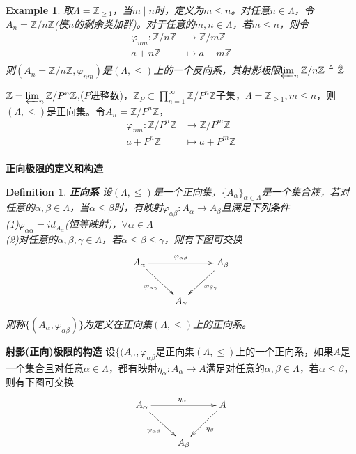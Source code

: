 \documentclass[UTF8]{article}
\newtheorem{defn}{Definition}[section]
\newtheorem{exa}{Example}[section]
\begin{document}
\begin{exa}
	取$\Lambda=\mathbb Z_{\geq1}$，当$m\mid n$时，定义为$m\leq n$。对任意$n\in\Lambda$，令$A_n=\mathbb Z/{n\mathbb Z}$(模$n$的剩余类加群)。对于任意的$m,n\in\Lambda$，若$m\leq n$，则令
	\[
	\begin{split}
	\varphi_{nm}:\mathbb Z/{n\mathbb Z}&\rightarrow\mathbb Z/{m\mathbb Z}\\
	a+n\mathbb Z&\longmapsto a+m\mathbb Z\\
	\end{split}
	\]
	则$(A_n=\mathbb Z/{n\mathbb Z},\varphi_{nm})$是$(\Lambda,\leq)$上的一个反向系，其射影极限$\varprojlim_{n}\mathbb Z/{n\mathbb Z}\triangleq\hat{\mathbb Z}$
\end{exa}




$\mathbb Z=\varprojlim_n\mathbb Z/{P^n\mathbb Z}$,($P$进整数)，$\mathbb Z_P\subset\prod_{n=1}^\infty{\mathbb Z/{P^n\mathbb Z}}$子集，$\Lambda=\mathbb Z_{\geq1},m\leq n$，则$(\Lambda,\leq)$是正向集。令$A_n=\mathbb Z/{P^n\mathbb Z}$，
\[
\begin{split}
\varphi_{nm}:\mathbb Z/{P^n\mathbb Z}&\rightarrow \mathbb Z/{P^m\mathbb Z}\\
a+P^n\mathbb Z&\longmapsto a+P^m\mathbb Z\\
\end{split}
\]

\textbf{正向极限的定义和构造}
\begin{defn}
	\textbf{正向系}
	设$(\Lambda,\leq)$是一个正向集，$\{A_{\alpha}\}_{\alpha\in\Lambda}$是一个集合簇，若对任意的$\alpha,\beta\in\Lambda$，当$\alpha\leq\beta$时，有映射$\varphi_{\alpha\beta}:A_{\alpha}\rightarrow A_{\beta}$且满足下列条件\\
	(1)$\varphi_{\alpha\alpha}=id_{A_{\alpha}}$(恒等映射)，$\forall\alpha\in\Lambda$\\
	(2)对任意的$\alpha,\beta,\gamma\in\Lambda$，若$\alpha\leq\beta\leq\gamma$，则有下图可交换
	$$
	\xymatrix{
		A_{\alpha}\ar[rr]^{\varphi_{\alpha\beta}}\ar[rd]_{\varphi_{\alpha\gamma}}& &A_{\beta}\\
		&A_{\gamma}\ar@{<-}[ru]_{\varphi_{\beta\gamma}}&
	}
	$$
	则称$\{(A_{\alpha},\varphi_{\alpha\beta})\}$为定义在正向集$(\Lambda,\leq)$上的正向系。
\end{defn}
\textbf{射影(正向)极限的构造}
设$\{(A_{\alpha},\varphi_{\alpha\beta}$是正向集$(\Lambda,\leq)$上的一个正向系，如果$A$是一个集合且对任意$\alpha\in\Lambda$，都有映射$\eta_{\alpha}:A_{\alpha}\rightarrow A$满足对任意的$\alpha,\beta\in\Lambda$，若$\alpha\leq\beta$，则有下图可交换
$$
\xymatrix{
	A_{\alpha}\ar[rr]^{\eta_{\alpha}}\ar[rd]_{\psi_{\alpha\beta}}& &A\\
	&A_{\beta}\ar@{<-}[ru]_{\eta_{\beta}}&
}
$$
\end{document}
